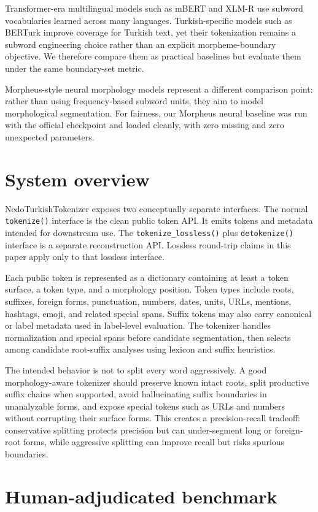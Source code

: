 \documentclass[11pt]{article}
\begin{document}
Transformer-era multilingual models such as mBERT and XLM-R use subword vocabularies learned across many languages. Turkish-specific models such as BERTurk improve coverage for Turkish text, yet their tokenization remains a subword engineering choice rather than an explicit morpheme-boundary objective. We therefore compare them as practical baselines but evaluate them under the same boundary-set metric.

Morpheus-style neural morphology models represent a different comparison point: rather than using frequency-based subword units, they aim to model morphological segmentation. For fairness, our Morpheus neural baseline was run with the official checkpoint and loaded cleanly, with zero missing and zero unexpected parameters.

\section{System overview}
NedoTurkishTokenizer exposes two conceptually separate interfaces. The normal \texttt{tokenize()} interface is the clean public token API. It emits tokens and metadata intended for downstream use. The \texttt{tokenize\_lossless()} plus \texttt{detokenize()} interface is a separate reconstruction API. Lossless round-trip claims in this paper apply only to that lossless interface.

Each public token is represented as a dictionary containing at least a token surface, a token type, and a morphology position. Token types include roots, suffixes, foreign forms, punctuation, numbers, dates, units, URLs, mentions, hashtags, emoji, and related special spans. Suffix tokens may also carry canonical or label metadata used in label-level evaluation. The tokenizer handles normalization and special spans before candidate segmentation, then selects among candidate root-suffix analyses using lexicon and suffix heuristics.

The intended behavior is not to split every word aggressively. A good morphology-aware tokenizer should preserve known intact roots, split productive suffix chains when supported, avoid hallucinating suffix boundaries in unanalyzable forms, and expose special tokens such as URLs and numbers without corrupting their surface forms. This creates a precision-recall tradeoff: conservative splitting protects precision but can under-segment long or foreign-root forms, while aggressive splitting can improve recall but risks spurious boundaries.

\section{Human-adjudicated benchmark}
\end{document}
